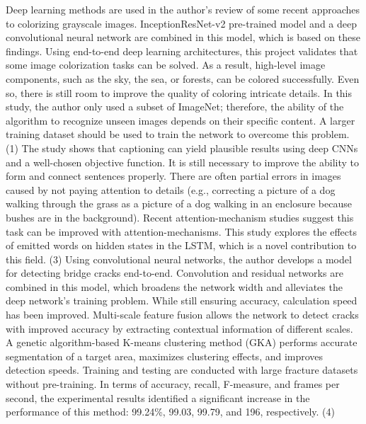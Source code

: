 \documentclass[conference]{IEEEtran}
\begin{document}
Deep learning methods are used in the author's review of some recent approaches to colorizing grayscale images. InceptionResNet-v2 pre-trained model and a deep convolutional neural network are combined in this model, which is based on these findings. Using end-to-end deep learning architectures, this project validates that some image colorization tasks can be solved. As a result, high-level image components, such as the sky, the sea, or forests, can be colored successfully. Even so, there is still room to improve the quality of coloring intricate details. In this study, the author only used a subset of ImageNet; therefore, the ability of the algorithm to recognize unseen images depends on their specific content. A larger training dataset should be used to train the network to overcome this problem. (1) The study shows that captioning can yield plausible results using deep CNNs and a well-chosen objective function. It is still necessary to improve the ability to form and connect sentences properly. There are often partial errors in images caused by not paying attention to details (e.g., correcting a picture of a dog walking through the grass as a picture of a dog walking in an enclosure because bushes are in the background). Recent attention-mechanism studies suggest this task can be improved with attention-mechanisms. This study explores the effects of emitted words on hidden states in the LSTM, which is a novel contribution to this field. (3) Using convolutional neural networks, the author develops a model for detecting bridge cracks end-to-end. Convolution and residual networks are combined in this model, which broadens the network width and alleviates the deep network's training problem. While still ensuring accuracy, calculation speed has been improved. Multi-scale feature fusion allows the network to detect cracks with improved accuracy by extracting contextual information of different scales. A genetic algorithm-based K-means clustering method (GKA) performs accurate segmentation of a target area, maximizes clustering effects, and improves detection speeds. Training and testing are conducted with large fracture datasets without pre-training. In terms of accuracy, recall, F-measure, and frames per second, the experimental results identified a significant increase in the performance of this method: 99.24\%, 99.03, 99.79, and 196, respectively. (4) 
\end{document}
